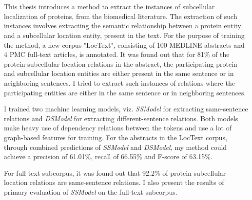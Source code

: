\chapter{\abstractname}


This thesis introduces a method to extract the instances of subcellular localization of proteins, from the biomedical literature. The extraction of such instances involves extracting the semantic relationship between a protein entity and a subcellular location entity, present in the text. For the purpose of training the method, a new corpus "LocText", consisting of 100 MEDLINE abstracts and 4 PMC full-text articles, is annotated. It was found out that for 81\% of the protein-subcellular location relations in the abstract, the participating protein and subcellular location entities are either present in the same sentence or in neighboring sentences. I tried to extract such instances of relations where the participating entities are either in the same sentence or in neighboring sentences.

I trained two machine learning models, viz. \textit{SSModel} for extracting same-sentence relations and \textit{DSModel} for extracting different-sentence relations. Both models make heavy use of dependency relations between the tokens and use a lot of graph-based features for training. For the abstracts in the LocText corpus, through combined predictions of \textit{SSModel} and \textit{DSModel}, my method could achieve a precision of 61.01\%, recall of 66.55\% and F-score of 63.15\%.

For full-text subcorpus, it was found out that 92.2\% of protein-subcellular location relations are same-sentence relations. I also present the results of primary evaluation of \textit{SSModel} on the full-text subcorpus.